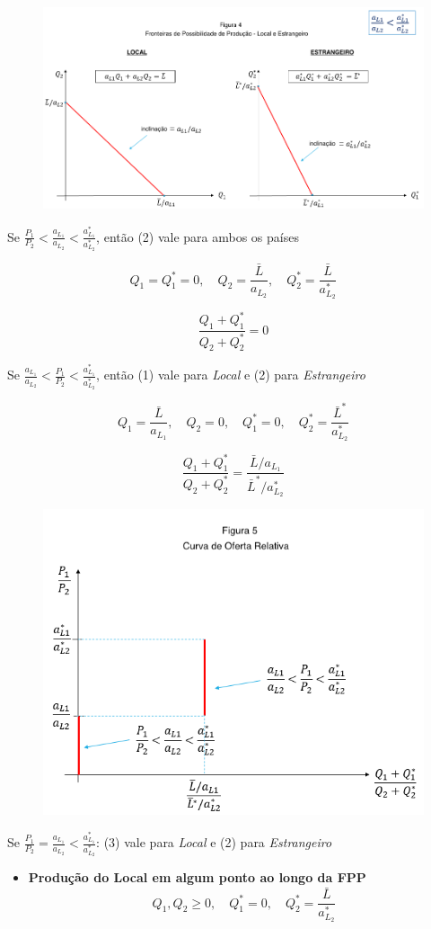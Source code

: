 \documentclass[a4paper,12pt]{article}[abntex2]
\begin{document}
\begin{figure}[H]
    \centering
    \includegraphics[width=0.7\linewidth]{Imagens/a8i2.png}
\end{figure}

Se \(\frac{P_1}{P_2} < \frac{a_{L_1}}{a_{L_2}} < \frac{a^*_{L_1}}{a^*_{L_2}}\), então (2) vale para ambos os países

\[
Q_1 = Q_1^* = 0, \quad Q_2 = \frac{\bar{L}}{a_{L_2}}, \quad Q_2^* = \frac{\bar{L}}{a^*_{L_2}} 
\]

\[
\frac{Q_1 + Q_1^*}{Q_2 + Q_2^*} = 0
\]

Se \(\frac{a_{L_1}}{a_{L_2}} < \frac{P_1}{P_2} < \frac{a^*_{L_1}}{a^*_{L_2}}\), então (1) vale para \textit{Local} e (2) para \textit{Estrangeiro}

\[
Q_1 = \frac{\bar{L}}{a_{L_1}}, \quad Q_2 = 0, \quad Q_1^* = 0, \quad Q_2^* = \frac{\bar{L}^*}{a^*_{L_2}}
\]

\[
\frac{Q_1 + Q_1^*}{Q_2 + Q_2^*} = \frac{\bar{L} / a_{L_1}}{\bar{L}^* / a^*_{L_2}}
\]

\begin{figure}[H]
    \centering
    \includegraphics[width=0.7\linewidth]{Imagens/a8i3.png}
\end{figure}

Se \(\frac{P_1}{P_2} = \frac{a_{L_1}}{a_{L_2}} < \frac{a^*_{L_1}}{a^*_{L_2}}\): (3) vale para \textit{Local} e (2) para \textit{Estrangeiro} \begin{itemize}
    \item \textbf{Produção do Local em algum ponto ao longo da FPP}
    \[
    Q_1, Q_2 \geq 0, \quad Q_1^* = 0, \quad Q_2^* = \frac{\bar{L}}{a^*_{L_2}}
    \]
\end{itemize}
\end{document}
